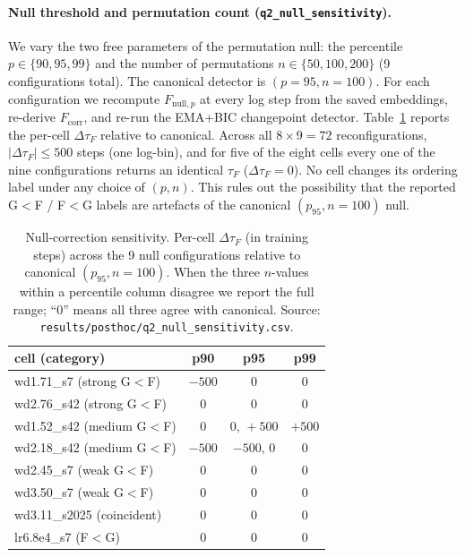 \documentclass{article}
\newcommand{\tauf}{\tau_{F}}
\newcommand{\fcorr}{F_{\mathrm{corr}}}
\begin{document}
\paragraph{Null threshold and permutation count (\texttt{q2\_null\_sensitivity}).}
We vary the two free parameters of the permutation null: the
percentile $p\in\{90,95,99\}$ and the number of permutations
$n\in\{50,100,200\}$ (9 configurations total).
The canonical detector is $(p{=}95,n{=}100)$.
For each configuration we recompute $F_{\mathrm{null},p}$ at every
log step from the saved embeddings, re-derive $\fcorr$, and re-run
the EMA+BIC changepoint detector.
Table~\ref{tab:q2_null_sensitivity} reports the
per-cell $\Delta\tauf$ relative to canonical.
Across all $8\times9=72$ reconfigurations, $|\Delta\tauf|\leq500$
steps (one log-bin), and for five of the eight cells every one of
the nine configurations returns an identical $\tauf$
($\Delta\tauf=0$).
No cell changes its ordering label under any choice of
$(p,n)$.
This rules out the possibility that the reported G$<$F / F$<$G
labels are artefacts of the canonical $(p_{95},n{=}100)$ null.
\begin{table}[tbp]
  \centering
  \caption{Null-correction sensitivity.
    Per-cell $\Delta\tauf$ (in training steps) across the 9 null
    configurations relative to canonical $(p_{95}, n{=}100)$.
    When the three $n$-values within a percentile column disagree
    we report the full range; ``$0$'' means all three agree with
    canonical.
    Source: \texttt{results/posthoc/q2\_null\_sensitivity.csv}.}
  \label{tab:q2_null_sensitivity}
  \small
  \begin{tabular}{lccc}
    \toprule
    cell (category) & p90 & p95 & p99 \\
    \midrule
    wd1.71\_s7 (strong G$<$F)     & $-500$ & $0$         & $0$            \\
    wd2.76\_s42 (strong G$<$F)    & $0$    & $0$         & $0$            \\
    wd1.52\_s42 (medium G$<$F)    & $0$    & $0,\,+500$  & $+500$         \\
    wd2.18\_s42 (medium G$<$F)    & $-500$ & $-500,\,0$  & $0$            \\
    wd2.45\_s7 (weak G$<$F)       & $0$    & $0$         & $0$            \\
    wd3.50\_s7 (weak G$<$F)       & $0$    & $0$         & $0$            \\
    wd3.11\_s2025 (coincident)    & $0$    & $0$         & $0$            \\
    lr6.8e4\_s7 (F$<$G)           & $0$    & $0$         & $0$            \\
    \bottomrule
  \end{tabular}
\end{table}
\end{document}
